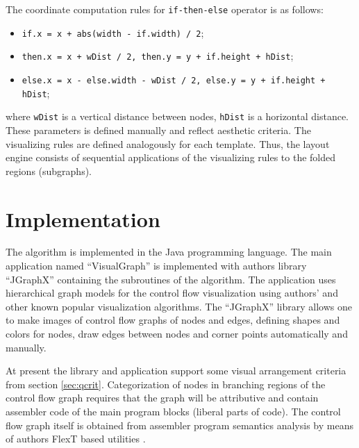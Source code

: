 \documentclass[conference]{IEEEtran}
\begin{document}
The coordinate computation rules for \texttt{if-then-else} operator is as follows:
\begin{itemize}
\item \texttt{if.x = x + abs(width - if.width) / 2};
\item \texttt{then.x = x  + wDist / 2, then.y = y + if.height + hDist};
\item \texttt{else.x = x - else.width - wDist / 2, else.y = y + if.height + hDist};
\end{itemize}
where \texttt{wDist} is a vertical distance between nodes, \texttt{hDist} is a horizontal distance.  These parameters is defined manually and reflect aesthetic criteria.  The visualizing rules are defined analogously for each template.  Thus, the layout engine consists of sequential applications of the visualizing rules to the folded regions (subgraphs).

\section{Implementation}
\label{sec:implementation}

The algorithm is implemented in the Java programming language.  The main application named ``VisualGraph'' is implemented with authors library ``JGraphX'' containing the subroutines of the algorithm.  The application uses hierarchical graph models for the control flow visualization using authors' and other known popular visualization algorithms.  The ``JGraphX'' library allows one to make images of control flow graphs of nodes and edges, defining shapes and colors for nodes, draw edges between nodes and corner points automatically and manually.

At present the library and application support some visual arrangement criteria from section \ref{sec:qcrit}.  Categorization of nodes in branching regions of the control flow graph requires that the graph will be attributive and contain assembler code of the main program blocks (liberal parts of code).  The control flow graph itself is obtained from assembler program semantics analysis by means of authors FlexT based utilities \cite{flext}.

%
%
\end{document}
